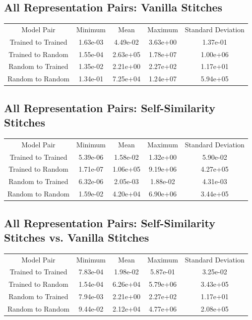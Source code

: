 \documentclass{article} %
\begin{document}
\label{Table4}
\subsection*{All Representation Pairs: Vanilla Stitches}
\begin{tabular}{c c c c c}
   Model Pair&Minimum&Mean&Maximum&Standard Deviation\\
   Trained to Trained&1.63e-03&4.49e-02&3.63e+00&1.37e-01\\
   Trained to Random&1.55e-04&2.63e+05&1.78e+07&1.00e+06\\
   Random to Trained&1.35e-02&2.21e+00&2.27e+02&1.17e+01\\
   Random to Random&1.34e-01&7.25e+04&1.24e+07&5.94e+05\\
\end{tabular}

\label{Table5}
\subsection*{All Representation Pairs: Self-Similarity Stitches}
\begin{tabular}{c c c c c}
   Model Pair&Minimum&Mean&Maximum&Standard Deviation\\
   Trained to Trained&5.39e-06&1.58e-02&1.32e+00&5.90e-02\\
   Trained to Random&1.71e-07&1.06e+05&9.19e+06&4.27e+05\\
   Random to Trained&6.32e-06&2.05e-03&1.88e-02&4.31e-03\\
   Random to Random&1.59e-02&4.20e+04&6.90e+06&3.44e+05\\
\end{tabular}

\label{Table6}
\subsection*{All Representation Pairs: Self-Similarity Stitches vs. Vanilla Stitches}
\begin{tabular}{c c c c c}
   Model Pair&Minimum&Mean&Maximum&Standard Deviation\\
   Trained to Trained&7.83e-04&1.98e-02&5.87e-01&3.25e-02\\
   Trained to Random&1.54e-04&6.26e+04&5.79e+06&3.43e+05\\
   Random to Trained&7.94e-03&2.21e+00&2.27e+02&1.17e+01\\
   Random to Random&9.44e-02&2.12e+04&4.77e+06&2.08e+05\\
\end{tabular}
\end{document}
